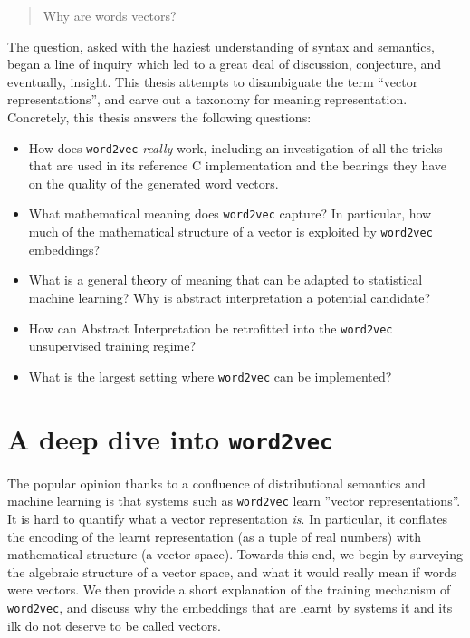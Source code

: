 \documentclass[11pt]{book}
\newcommand{\wtov}{\texttt{word2vec }}
\begin{document}
\begin{quote}
Why are words vectors?
\end{quote}

The question, asked with the haziest understanding of syntax and semantics,
began a line of inquiry which led to a great deal of discussion, 
conjecture, and eventually, insight. This thesis attempts to 
disambiguate the term ``vector representations'', and carve out a taxonomy
for meaning representation. Concretely, this thesis answers
the following questions:

\begin{itemize}
	\item How does \texttt{word2vec} \emph{really} work, including an investigation of all the tricks that are used in its reference C implementation and the bearings they have on the quality of the generated word vectors.
	\item What mathematical meaning does \texttt{word2vec} capture? In particular, how much of the mathematical structure of a vector is exploited by \texttt{word2vec} embeddings?
	\item What is a general theory of meaning that can be adapted to statistical machine learning? Why is abstract interpretation a potential candidate?
	\item How can Abstract Interpretation be retrofitted into the  \texttt{word2vec} unsupervised training regime?
	\item What is the largest setting where \texttt{word2vec} can be implemented?
\end{itemize}



\chapter{A deep dive into \wtov }

The popular opinion thanks to a confluence of distributional semantics
and machine learning is that systems such as \texttt{word2vec} learn
''vector representations''. It is hard to quantify what a vector representation \emph{is}.
In particular, it conflates the encoding of the learnt representation
(as a tuple of real numbers) with mathematical structure
(a vector space). 
Towards this end, we begin by surveying the algebraic structure of a vector
space, and what it would really mean if words were vectors. We then provide
a short explanation of the training mechanism of \texttt{word2vec}, and
discuss why the embeddings that are learnt by systems it and its ilk do not
deserve to be called vectors. 
\end{document}

